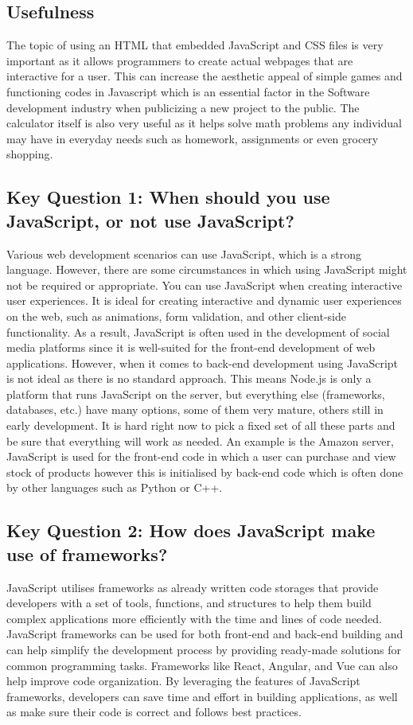 \documentclass[a4paper, 11pt]{report}
\begin{document}
{\subsection{Usefulness}
The topic of using an HTML that embedded JavaScript and CSS files is very important as it allows programmers to create actual webpages that are interactive for a user. This can increase the aesthetic appeal of simple games and functioning codes in Javascript which is an essential factor in the Software development industry when publicizing a new project to the public. The calculator itself is also very useful as it helps solve math problems any individual may have in everyday needs such as homework, assignments or even grocery shopping. 
\cite{LevelC1}

\subsection{Key Question 1: When should you use JavaScript, or not use JavaScript?}
Various web development scenarios can use JavaScript, which is a strong language. However, there are some circumstances in which using JavaScript might not be required or appropriate. You can use JavaScript when creating interactive user experiences. It is ideal for creating interactive and dynamic user experiences on the web, such as animations, form validation, and other client-side functionality. As a result, JavaScript is often used in the development of social media platforms since it is well-suited for the front-end development of web applications. However, when it comes to back-end development using JavaScript is not ideal as there is no standard approach. This means Node.js is only a platform that runs JavaScript on the server, but everything else (frameworks, databases, etc.) have many options, some of them very mature, others still in early development. It is hard right now to pick a fixed set of all these parts and be sure that everything will work as needed. An example is the Amazon server, JavaScript is used for the front-end code in which a user can purchase and view stock of products however this is initialised by back-end code which is often done by other languages such as Python or C++.
\cite{LevelC2}

\subsection{Key Question 2: How does JavaScript make use of frameworks?}
JavaScript utilises frameworks as already written code storages that provide developers with a set of tools, functions, and structures to help them build complex applications more efficiently with the time and lines of code needed. JavaScript frameworks can be used for both front-end and back-end building and can help simplify the development process by providing ready-made solutions for common programming tasks. Frameworks like React, Angular, and Vue can also help improve code organization. By leveraging the features of JavaScript frameworks, developers can save time and effort in building applications, as well as make sure their code is correct and follows best practices.
\cite{LevelC3}

}
\end{document}
